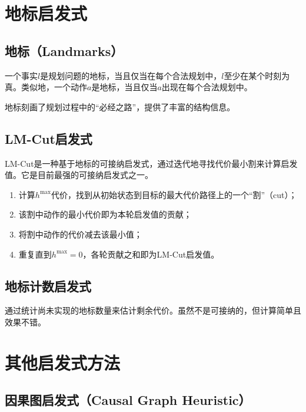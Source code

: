 \section{地标启发式 \grad}

\subsection{地标（Landmarks）}

\begin{definition}[规划地标]
一个事实$l$是规划问题的地标，当且仅当在每个合法规划中，$l$至少在某个时刻为真。类似地，一个动作$a$是地标，当且仅当$a$出现在每个合法规划中。
\end{definition}

地标刻画了规划过程中的``必经之路''，提供了丰富的结构信息。

\subsection{LM-Cut启发式}

LM-Cut是一种基于地标的可接纳启发式，通过迭代地寻找代价最小割来计算启发值。它是目前最强的可接纳启发式之一。

\begin{algbox}[title={\textbf{LM-Cut核心思想}}]
\begin{enumerate}
  \item 计算$h^{\max}$代价，找到从初始状态到目标的最大代价路径上的一个``割''（cut）；
  \item 该割中动作的最小代价即为本轮启发值的贡献；
  \item 将割中动作的代价减去该最小值；
  \item 重复直到$h^{\max} = 0$，各轮贡献之和即为LM-Cut启发值。
\end{enumerate}
\end{algbox}

\subsection{地标计数启发式}

通过统计尚未实现的地标数量来估计剩余代价。虽然不是可接纳的，但计算简单且效果不错。

\section{其他启发式方法 \self}

\subsection{因果图启发式（Causal Graph Heuristic）}

